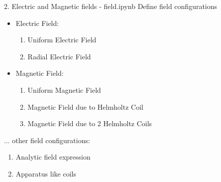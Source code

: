 \documentclass{beamer}
\begin{document}
	\begin{frame}
		
	\end{frame}
	\begin{frame}
		
	\end{frame}

	\begin{frame}[t]{2. Electric and Magnetic fields - field.ipynb}
		Define field configurations \\
		\vspace{0.5cm}
		\begin{itemize}
			\item Electric Field:
			\begin{enumerate}
				\item Uniform Electric Field
				\item Radial Electric Field
			\end{enumerate}
			\item Magnetic Field: 
			\begin{enumerate}
				\item Uniform Magnetic Field
				\item Magnetic Field due to Helmholtz Coil
				\item Magnetic Field due to 2 Helmholtz Coils
			\end{enumerate}
		\end{itemize}
	... other field configurations:
	\begin{enumerate}
		\item Analytic field expression
		\item Apparatus like coils
	\end{enumerate}
	\end{frame}
	\begin{frame}
		
	\end{frame}
	\begin{frame}
		
	\end{frame}
\end{document}
